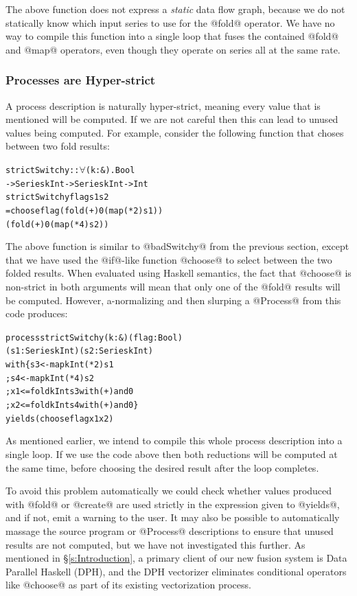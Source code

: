The above function does not express a \emph{static} data flow graph, because we do not statically know which input series to use for the @fold@ operator. We have no way to compile this function into a single loop that fuses the contained @fold@ and @map@ operators, even though they operate on series all at the same rate. 


\subsubsection{Processes are Hyper-strict}
A process description is naturally hyper-strict, meaning every value that is mentioned will be computed. If we are not careful then this can lead to unused values being computed. For example, consider the following function that choses between two fold results:

\begin{alltt}
strictSwitchy :: \(\forall\)(k : &). Bool 
              -> Series k Int -> Series k Int -> Int
strictSwitchy flag s1 s2
 = choose flag (fold (+) 0 (map (* 2) s1))
               (fold (+) 0 (map (* 4) s2))
\end{alltt}

The above function is similar to @badSwitchy@ from the previous section, except that we have used the @if@-like function @choose@ to select between the two folded results. When evaluated using Haskell semantics, the fact that @choose@ is non-strict in both arguments will mean that only one of the @fold@ results will be computed. However, a-normalizing and then slurping a @Process@ from this code produces:

\begin{alltt}
 process strictSwitchy (k : &) (flag : Bool) 
          (s1 : Series k Int) (s2 : Series k Int)
  with \{ s3 <- map  k Int (* 2) s1
       ; s4 <- map  k Int (* 4) s2
       ; x1 <= fold k Int s3 with (+) and 0
       ; x2 <= fold k Int s4 with (+) and 0 \}
  yields (choose flag x1 x2)
\end{alltt}

As mentioned earlier, we intend to compile this whole process description into a single loop. If we use the code above then both reductions will be computed at the same time, before choosing the desired result after the loop completes. 

To avoid this problem automatically we could check whether values produced with @fold@ or @create@ are used strictly in the expression given to @yields@, and if not, emit a warning to the user. It may also be possible to automatically massage the source program or @Process@ descriptions to ensure that unused results are not computed, but we have not investigated this further. As mentioned in \S\ref{s:Introduction}, a primary client of our new fusion system is Data Parallel Haskell (DPH), and the DPH vectorizer eliminates conditional operators like @choose@ as part of its existing vectorization process. 

